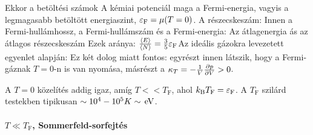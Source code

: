     Ekkor a betöltési számok
    A kémiai potenciál maga a Fermi-energia, vagyis a legmagasabb betöltött energiaszint, $\varepsilon_\text{F}=\mu(T=0)$. A részecskeszám:
    Innen a Fermi-hullámhossz, a Fermi-hullámszám és a Fermi-energia:
    Az átlagenergia ás az átlagos részecskeszám
    Ezek aránya: $\frac{\left\langle E\right\rangle}{\left\langle N\right\rangle}=\frac{3}{5}\varepsilon_\text{F}$Az ideális gázokra levezetett  egyenlet alapján:
    Ez két dolog miatt fontos: egyrészt innen látszik, hogy a Fermi-gáznak $T=0$-n is van nyomása, másrészt a $\kappa_T=-\frac{1}{V}\frac{\partial p}{\partial V}>0$.
    
    A $T=0$ közelítés addig igaz, amíg $T<<T_\text{F}$, ahol $k_\text{B} T_\text{F}=\varepsilon_\text{F}$. A $T_\text{F}$ szilárd testekben tipikusan $\sim 10^4-10^{5} K\sim \mathrm{\, eV}$.
    
   \paragraph{$T\ll T_\text{F}$, Sommerfeld-sorfejtés}
    
